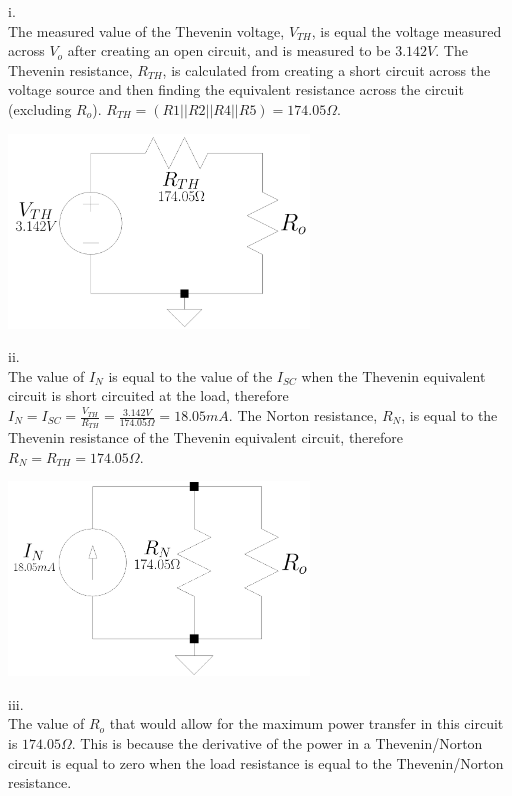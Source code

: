 \documentclass[12pt]{article}
\begin{document}
\thispagestyle{prelabheader}
i. \\
The measured value of the Thevenin voltage, $V_{TH}$, is equal the voltage measured across $V_o$ after creating an open circuit, and is measured to be $3.142V$. The Thevenin resistance, $R_{TH}$, is calculated from creating a short circuit across the voltage source and then finding the equivalent resistance across the circuit (excluding $R_o$). $R_{TH} = (R1||R2||R4||R5) = 174.05\Omega$. \\
\begin{center}
    \includegraphics[width=0.6\textwidth]{thevenincircuit.png}
\end{center}

ii. \\
The value of $I_N$ is equal to the value of the $I_{SC}$ when the Thevenin equivalent circuit is short circuited at the load, therefore $I_N = I_{SC} = \frac{V_{TH}}{R_{TH}} = \frac{3.142V}{174.05\Omega} = 18.05mA$. The Norton resistance, $R_N$, is equal to the Thevenin resistance of the Thevenin equivalent circuit, therefore $R_N = R_{TH} = 174.05\Omega$. \\
\begin{center}
    \includegraphics[width=0.6\textwidth]{nortoncircuit.png}
\end{center}
\restoregeometry
\clearpage
iii. \\ The value of $R_o$ that would allow for the maximum power transfer in this circuit is $174.05\Omega$. This is because the derivative of the power in a Thevenin/Norton circuit is equal to zero when the load resistance is equal to the Thevenin/Norton resistance.
\end{document}
